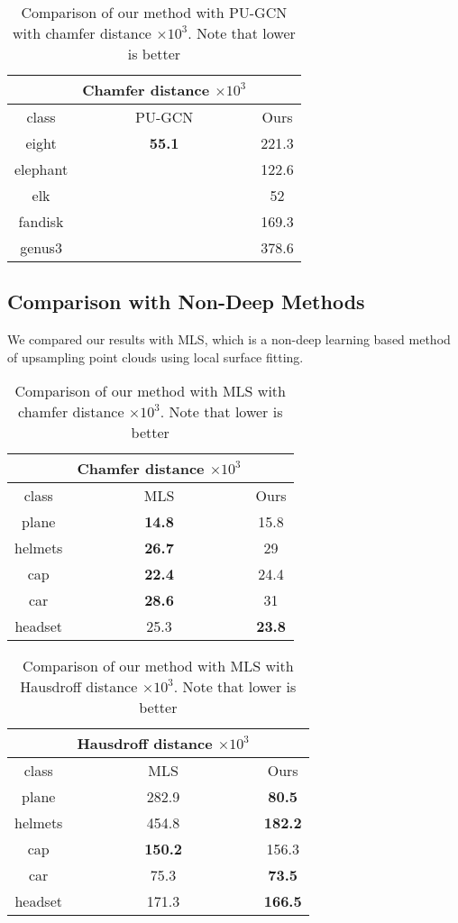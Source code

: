 \begin{table}[H]
\centering
\begin{tabular}{ccc}
	& Chamfer distance $\times 10^3$ &\\
	\hline
	class & PU-GCN & Ours \\
	\hline
	eight & \textbf{55.1} & {221.3} \\ 
	elephant &  \textbf{}& {122.6} \\
	elk & {} & {52} \\  
	fandisk & {} & {169.3} \\  
	genus3 & {} & {378.6}  \\
\end{tabular}
\caption{Comparison of our method with PU-GCN with chamfer distance $\times 10^3$. Note that lower is better}
\end{table}

\subsection{Comparison with Non-Deep Methods}

We compared our results with MLS, which is a non-deep learning based method of upsampling point clouds using local surface fitting.

\begin{table}[H]
\centering
\begin{tabular}{ccc}
	& Chamfer distance $\times 10^3$ &\\
	\hline
	class & MLS & Ours \\
	\hline
	plane & \textbf{14.8} & 15.8 \\ 
	helmets & \textbf{26.7} & 29 \\
	cap & \textbf{22.4} & 24.4 \\  
	car & \textbf{28.6} & 31 \\  
	headset & {25.3} & \textbf{23.8}  \\
\end{tabular}
\caption{Comparison of our method with MLS with chamfer distance $\times 10^3$. Note that lower is better}
\end{table}

\begin{table}[H]
\centering
\begin{tabular}{ccc}
	& Hausdroff distance $\times 10^3$ &\\
	\hline
	class & MLS & Ours \\
	\hline
	plane & 282.9 & \textbf{80.5} \\ 
helmets & 454.8 &  \textbf{182.2}\\
cap & \textbf{150.2} & 156.3 \\ 
car & 75.3 & \textbf{73.5} \\  
headset & 171.3 & \textbf{166.5} \\
\end{tabular}
\caption{Comparison of our method with MLS with Hausdroff distance $\times 10^3$. Note that lower is better}
\end{table}

